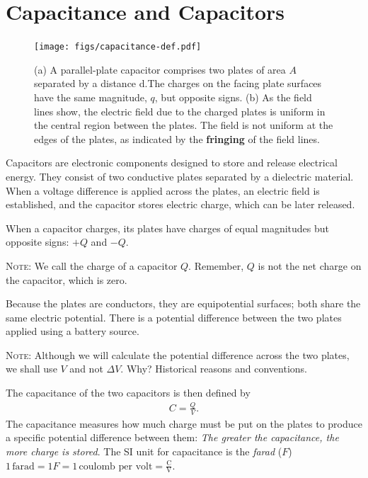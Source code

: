 \documentclass[12pt,b4paper]{article}
\begin{document}
\section{Capacitance and Capacitors}
\begin{figure}[H]
    \centering
    \texttt{[image: figs/capacitance-def.pdf]}
    \caption{(a) A parallel-plate capacitor comprises two plates of area $A$ separated by a distance d.The charges on the facing plate surfaces have the same magnitude, $q$, but opposite signs. (b) As the field lines show, the electric field due to the charged plates is uniform in the central region between the plates. The field is not uniform at the edges of the plates, as indicated by the \textbf{fringing} of the field lines.}
    \label{fig:capacitance}
\end{figure}
Capacitors are electronic components designed to store and release electrical energy. They consist of two conductive plates separated by a dielectric material. When a voltage difference is applied across the plates, an electric field is established, and the capacitor stores electric charge, which can be later released.

When a capacitor charges, its plates have charges of equal magnitudes but
opposite signs: $+Q$ and $-Q$. 

\textsc{Note}: We call the charge of a capacitor $Q$. Remember, $Q$ is not the net charge on the capacitor, which is zero.

Because the plates are conductors, they are equipotential surfaces; both share the same electric potential. There is a potential difference between the two plates applied using a battery source.

\textsc{Note}: Although we will calculate the potential difference across the two plates, we shall use $V$ and not $\Delta V$. Why? Historical reasons and conventions.

The capacitance of the two capacitors is then defined by
\begin{align}
    C=\frac{Q}{V}.
\end{align}
The capacitance measures how much charge must be put on the plates to produce a specific potential difference between them: \textit{The greater the capacitance, the more charge is stored}.
The SI unit for capacitance is the \textit{farad} ($F$) $\displaystyle1\,\text{farad}=1F=1\,\text{coulomb per volt}=\frac{\text{C}}{\text{V}}$.
\end{document}

